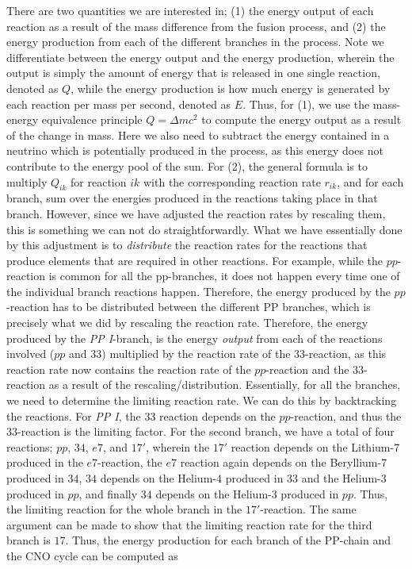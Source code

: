 \documentclass[a4paper,10pt,english]{article}
\begin{document}
There are two quantities we are interested in; (1) the energy output of each reaction as a result of the mass difference from the fusion process, and (2) the energy production from each of the different branches in the process. Note we differentiate between the energy output and the energy production, wherein the output is simply the amount of energy that is released in one single reaction, denoted as $Q$, while the energy production is how much energy is generated by each reaction per mass per second, denoted as $E$. Thus, for (1), we use the mass-energy equivalence principle $Q = \Delta m c^2$ to compute the energy output as a result of the change in mass. Here we also need to subtract the energy contained in a neutrino which is potentially produced in the process, as this energy does not contribute to the energy pool of the sun. For (2), the general formula is to multiply $Q_{ik}$ for reaction $ik$ with the corresponding reaction rate $r_{ik}$, and for each branch, sum over the energies produced in the reactions taking place in that branch. However, since we have adjusted the reaction rates by rescaling them, this is something we can not do straightforwardly. What we have essentially done by this adjustment is to \textit{distribute} the reaction rates for the reactions that produce elements that are required in other reactions. For example, while the $pp$-reaction is common for all the pp-branches, it does not happen every time one of the individual branch reactions happen. Therefore, the energy produced by the $pp$-reaction has to be distributed between the different PP branches, which is precisely what we did by rescaling the reaction rate. Therefore, the energy produced by the \textit{PP I}-branch, is the energy \textit{output} from each of the reactions involved ($pp$ and $33$) multiplied by the reaction rate of the $33$-reaction, as this reaction rate now contains the reaction rate of the $pp$-reaction and the $33$-reaction as a result of the rescaling/distribution. Essentially, for all the branches, we need to determine the limiting reaction rate. We can do this by backtracking the reactions. For \textit{PP I}, the $33$ reaction depends on the $pp$-reaction, and thus the $33$-reaction is the limiting factor. For the second branch, we have a total of four reactions; $pp$, $34$, $e7$, and $17'$, wherein the $17'$ reaction depends on the Lithium-7 produced in the $e7$-reaction, the $e7$ reaction again depends on the Beryllium-7 produced in $34$, $34$ depends on the Helium-4 produced in $33$ and the Helium-3 produced in $pp$, and finally $34$ depends on the Helium-3 produced in $pp$. Thus, the limiting reaction for the whole branch in the $17'$-reaction. The same argument can be made to show that the limiting reaction rate for the third branch is $17$. Thus, the energy production for each branch of the PP-chain and the CNO cycle can be computed as
\end{document}
